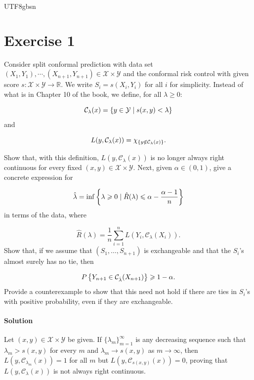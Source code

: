 \documentclass[../../main.tex]{subfiles}
\begin{document}
\begin{CJK*}{UTF8}{gbsn}

\section*{Exercise 1}

Consider split conformal prediction 
with data set $(X_1, Y_1), \cdots, (X_{n+1}, Y_{n+1}) \in \mathcal{X} \times \mathcal{Y}$ 
and the conformal risk control with given score 
$s : \mathcal{X} \times \mathcal{Y} \to \mathbb{R}$.
We write $S_i = s(X_i, Y_i)$ for all $i$ for simplicity.
Instead of what is in Chapter 10 of the book, we define,
for all $\lambda \geqslant 0$:

\begin{equation*}
    \mathcal{C}_{\lambda}(x)
    = \left \{ y \in \mathcal{Y} \mid s(x,y) < \lambda  \right \}
\end{equation*}
and 

\begin{equation*}
    L(y,\mathcal{C}_{\lambda}(x))
= \chi_{ \left \{ y \notin \mathcal{C}_{\lambda}(x) \right \} }.
\end{equation*}

Show that, with this definition,
$L(y,\mathcal{C}_{\lambda}(x))$ 
is no longer always right continuous for every 
fixed $(x,y) \in \mathcal{X} \times \mathcal{Y}$.
Next, given $\alpha \in (0,1)$, give a concrete expression for 

\begin{equation*}
    \hat{\lambda} = \inf \left \{ \lambda \geqslant 0 \mid \hat{R}(\lambda) 
    \leqslant \alpha - \frac{\alpha - 1}{n} \right \}
\end{equation*}
in terms of the data,
where 

\begin{equation*}
    \hat{R}(\lambda) = \frac{1}{n} \sum_{i=1}^n L(Y_i,\mathcal{C}_{\lambda}(X_i)).
\end{equation*}
Show that, if we assume that $(S_1, \ldots, S_{n+1})$ is exchangeable 
and that the $S_i$'s almost surely has no tie,
then 

\begin{equation*}
    P\left \{ Y_{n+1}\in\mathcal{C}_{\hat{\lambda}}(X_{n+1}) \right \}
    \geqslant 1-\alpha.
\end{equation*}
Provide a counterexample to show that 
this need not hold if there are ties in $S_i$'s with positive probability,
even if they are exchangeable.

\paragraph{Solution}
Let $(x,y) \in \mathcal{X} \times \mathcal{Y}$ be given.
If $\{\lambda_m\}_{m=1}^{\infty}$ is any decreasing sequence such that
$\lambda_m > s(x,y)$ for every $m$ and $\lambda_m \to s(x,y)$ as $m \to \infty$,
then $L(y,\mathcal{C}_{\lambda_m}(x)) = 1$ for all $m$ 
but $L(y,\mathcal{C}_{s(x,y)}(x)) = 0$, proving that 
$L(y,\mathcal{C}_{\lambda}(x))$ is not always right continuous.


\end{CJK*}
\end{document}

